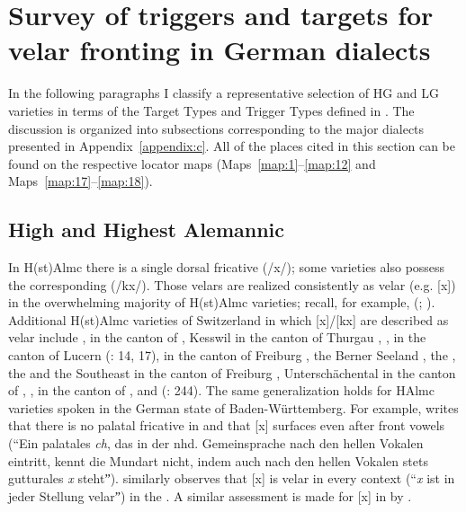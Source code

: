 \section{{Survey} {of} {triggers} {and} {targets} {for} {velar} {fronting} {in} {German} {dialects}}\label{sec:12.3}

In the following paragraphs I classify a representative selection of HG and LG varieties in terms of the Target Types and Trigger Types defined in . The discussion is organized into subsections corresponding to the major dialects presented in Appendix~\ref{appendix:c}. All of the places cited in this section can be found on the respective locator maps (Maps~\ref{map:1}--\ref{map:12} and Maps~\ref{map:17}--\ref{map:18}).

\subsection{High and Highest Alemannic}\label{sec:12.3.1}

In H(st)Almc there is a single dorsal fricative (/x/); some varieties also possess the corresponding  (/kx/). Those velars are realized consistently as velar (e.g. [x]) in the overwhelming majority of H(st)Almc varieties; recall, for example,  (\citealt{Streiff1915}; ). Additional H(st)Almc varieties of Switzerland in which [x]/[kx] are described as velar include  \citep[17]{Winteler1876},  in the canton of  \citep[9]{Abegg1910}, Kesswil in the canton of Thurgau \citep[8]{Enderlin1910},  \citep[16]{Hausknecht1911},  in the canton of Lucern (\citealt{Schmid1915}: 14, 17),  in the canton of Freiburg \citep[21]{Stucki1917}, the Berner Seeland \citep[11]{Baumgartner1922}, the  \citep[18]{Weber1923}, the  and the Southeast  in the canton of Freiburg \citep[20]{Henzen1927}, Unterschächental in the canton of  \citep[20]{Clauss1929},  \citep[8-9]{Wanner1941},  in the canton of  \citep[37]{Schultz1951}, and  (\citealt{FleischerSchmid2006}: 244). The same generalization holds for HAlmc varieties spoken in the German state of Baden-Württemberg. For example, \citet[9-10]{Kaiser1910} writes that there is no palatal fricative in  and that [x] surfaces even after front vowels (“Ein palatales \textit{ch}, das in der nhd. Gemeinsprache nach den hellen Vokalen eintritt, kennt die Mundart nicht, indem auch nach den hellen Vokalen stets gutturales \textit{x} stehtˮ). \citet[56]{Beck1926} similarly observes that [x] is velar in every context (“\textit{x} ist in jeder Stellung velarˮ) in the . A similar assessment is made for [x] in  by \citet{Keller1963}.

